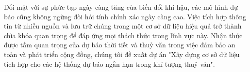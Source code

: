 
Đối mặt với sự phức tạp ngày càng tăng của biến đổi khí hậu, các mô hình dự báo cũng không ngừng đòi hỏi tính chính xác ngày càng cao. Việc tích hợp thông tin từ nhiều nguồn và lưu trữ chúng trong một cơ sở dữ liệu hiệu quả trở thành chìa khóa quan trọng để đáp ứng mọi thách thức trong lĩnh vực này. Nhận thức được tầm quan trọng của dự báo thời tiết và thuỷ văn trong việc đảm bảo an toàn và phát triển cộng đồng,  chúng tôi đề xuất dự án "Xây dựng cơ sở dữ liệu tích hợp cho các hệ thống dự báo ngắn hạn trong khí tượng thuỷ văn".
